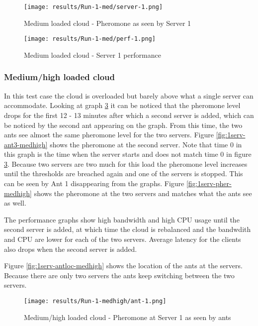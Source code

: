 \begin{figure}
	\centering
		\texttt{[image: results/Run-1-med/server-1.png]}
	\caption{Medium loaded cloud - Pheromone as seen by Server 1}
	\label{fig:1serv-pher-med}
\end{figure}

\begin{figure}
	\centering
		\texttt{[image: results/Run-1-med/perf-1.png]}
	\caption{Medium loaded cloud - Server 1 performance}
	\label{fig:1serv-perf-med}
\end{figure}

\subsubsection{Medium/high loaded cloud}

In this test case the cloud is overloaded but barely above what a single server can accommodate. Looking at graph \ref{fig:1serv-ant1-medhigh} it can be noticed that the pheromone level drops for the first 12 - 13 minutes after which a second server is added, which can be noticed by the second ant appearing on the graph. From this time, the two ants see almost the same pheromone level for the two servers. Figure \ref{fig:1serv-ant3-medhigh} shows the pheromone at the second server. Note that time 0 in this graph is the time when the server starts and does not match time 0 in figure \ref{fig:1serv-ant1-medhigh}. Because two servers are two much for this load the pheromone level increases until the thresholds are breached again and one of the servers is stopped. This can be seen by Ant 1 disappearing from the graphs. Figure \ref{fig:1serv-pher-medhigh} shows the pheromone at the two servers and matches what the ants see as well.

The performance graphs show high bandwidth and high CPU usage until the second server is added, at which time the cloud is rebalanced and the bandwdith and CPU are lower for each of the two servers. Average latency for the clients also drops when the second server is added.

Figure \ref{fig:1serv-antloc-medhigh} shows the location of the ants at the servers. Because there are only two servers the ants keep switching between the two servers.

\begin{figure}[!ht]
	\centering
		\texttt{[image: results/Run-1-medhigh/ant-1.png]}
	\caption{Medium/high loaded cloud - Pheromone at Server 1 as seen by ants}
	\label{fig:1serv-ant1-medhigh}
\end{figure}


